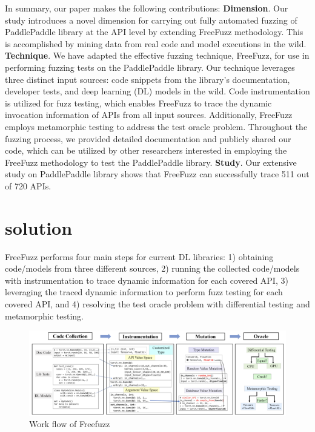 \documentclass[sigconf]{acmart}
\begin{document}
In summary, our paper makes the following contributions:
\newline\textbf{Dimension}.  Our study introduces a novel dimension for carrying out fully automated fuzzing of PaddlePaddle library at the API level by extending FreeFuzz methodology. 
This is accomplished by mining data from real code and model executions in the wild.
\newline\textbf{Technique}. We have adapted the effective fuzzing technique, FreeFuzz, for use in performing fuzzing tests on the PaddlePaddle library. 
Our technique leverages three distinct input sources: code snippets from the library's documentation, developer tests, and deep learning (DL) models in the wild. 
Code instrumentation is utilized for fuzz testing, which enables FreeFuzz to trace the dynamic invocation information of APIs from all input sources. 
Additionally, FreeFuzz employs metamorphic testing to address the test oracle problem. Throughout the fuzzing process, we provided detailed documentation and publicly shared our code, 
which can be utilized by other researchers interested in employing the FreeFuzz methodology to test the PaddlePaddle library.
\newline\textbf{Study}. Our extensive study on PaddlePaddle library shows that FreeFuzz can successfully trace 511 out of 720 APIs.



\section{solution}
FreeFuzz performs four main steps for current DL libraries: 1) obtaining code/models from three different sources, 2) running the collected code/models with instrumentation to trace dynamic information for each covered API, 3) leveraging the traced dynamic information to perform fuzz testing for each covered API, and 4) resolving the test oracle problem with differential testing and metamorphic testing.

\begin{figure}[h]
  \centering
  \includegraphics[width=\linewidth]{1.png}
  \caption{Work flow of Freefuzz}
\end{figure}
\end{document}
